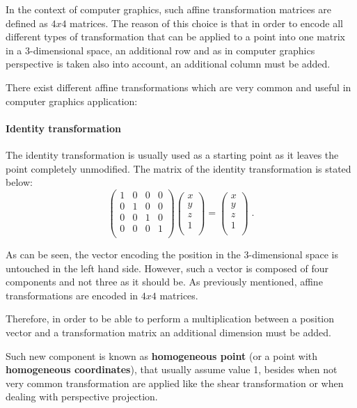 \documentclass[12pt,a4paper]{extarticle}
\newcommand{\linespace}{\vspace{8pt}}
\begin{document}
In the context of computer graphics, such affine transformation matrices are defined as $4x4$ matrices. The reason of this choice is that in order to encode all different types of transformation that can be applied to a point into one matrix in a 3-dimensional space, an additional row and as in computer graphics perspective is taken also into account, an additional column must be added.
\linespace

There exist different affine transformations which are very common and useful in computer graphics application:
\paragraph{Identity transformation} The identity transformation is usually used as a starting point as it leaves the point completely unmodified. The matrix of the identity transformation is stated below:
\[
\begin{pmatrix}
1 & 0 & 0 & 0\\
0 & 1 & 0 & 0\\
0 & 0 & 1 & 0\\
0 & 0 & 0 & 1\\
\end{pmatrix}
\begin{pmatrix}
x\\
y\\
z\\
1\\
\end{pmatrix}
=
\begin{pmatrix}
x\\
y\\
z\\
1\\
\end{pmatrix}
\;.
\]

As can be seen, the vector encoding the position in the 3-dimensional space is untouched in the left hand side. However, such a vector is composed of four components and not three as it should be. As previously mentioned, affine transformations are encoded in $4x4$ matrices.

Therefore, in order to be able to perform a multiplication between a position vector and a transformation matrix an additional dimension must be added. 
 
Such new component is known as \textbf{homogeneous point} (or a point with \textbf{homogeneous coordinates}), that usually assume value 1, besides when not very common transformation are applied like the shear transformation or when dealing with perspective projection.
\end{document}
